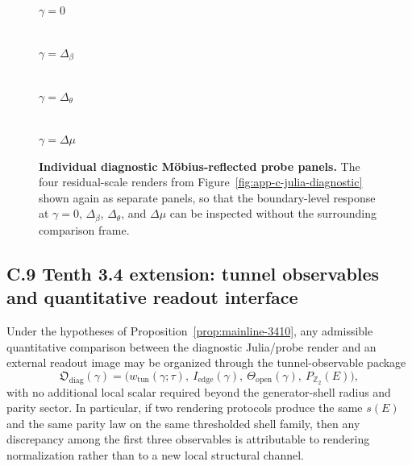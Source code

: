 \begin{figure}[H]
\centering
\begin{minipage}{0.475\textwidth}
\centering
{}
\\[-0.5ex]
{\footnotesize $\gamma=0$}
\end{minipage}\hfill
\begin{minipage}{0.47\textwidth}
\centering
{}
\\[-0.5ex]
{\footnotesize $\gamma=\Delta_\beta$}
\end{minipage}

\medskip

\begin{minipage}{0.47\textwidth}
\centering
{}
\\[-0.5ex]
{\footnotesize $\gamma=\Delta_\theta$}
\end{minipage}\hfill
\begin{minipage}{0.47\textwidth}
\centering
{}
\\[-0.5ex]
{\footnotesize $\gamma=\Delta\mu$}
\end{minipage}
\caption{\textbf{Individual diagnostic M\"obius-reflected probe panels.} The four residual-scale renders from Figure~\ref{fig:app-c-julia-diagnostic} shown again as separate panels, so that the boundary-level response at $\gamma=0$, $\Delta_\beta$, $\Delta_\theta$, and $\Delta\mu$ can be inspected without the surrounding comparison frame.}
\label{fig:app-c-julia-panels}
\end{figure}


\subsection*{C.9 Tenth 3.4 extension: tunnel observables and quantitative readout interface}

\begin{proposition}
\label{prop:appendix-3410}
Under the hypotheses of Proposition~\ref{prop:mainline-3410}, any admissible quantitative comparison between the diagnostic Julia/probe render and an external readout image may be organized through the tunnel-observable package
\[
  \mathfrak O_{\mathrm{diag}}(\gamma)
  =\bigl(w_{\mathrm{tun}}(\gamma;\tau),\ I_{\mathrm{edge}}(\gamma),\ \Theta_{\mathrm{open}}(\gamma),\ P_{\mathbb Z_2}(E)\bigr),
\]
with no additional local scalar required beyond the generator-shell radius and parity sector. In particular, if two rendering protocols produce the same $s(E)$ and the same parity law on the same thresholded shell family, then any discrepancy among the first three observables is attributable to rendering normalization rather than to a new local structural channel.
\end{proposition}


